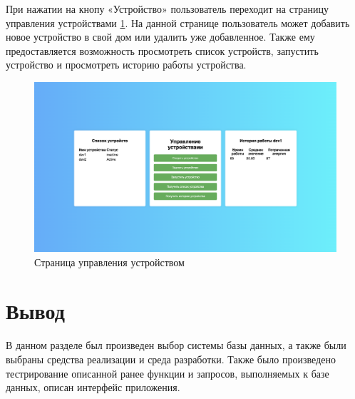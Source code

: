 При нажатии на кнопу «Устройство» пользователь переходит на страницу управления устройствами \ref{img:dev}. На данной странице 
пользователь может добавить новое устройство в свой дом или удалить уже добавленное. Также ему предоставляется возможность
просмотреть список устройств, запустить устройство и просмотреть историю работы устройства.

\begin{figure}[H]
    \includegraphics[width=1\linewidth]{img/device.png}
    \caption{\label{img:dev} Страница управления устройством}
\end{figure}
\noindent

\section*{Вывод}

В данном разделе был произведен выбор системы базы данных, а также
были выбраны средства реализации и среда разработки. Также было произведено тестрирование 
описанной ранее функции и запросов, выполняемых к базе данных, описан интерфейс приложения.
